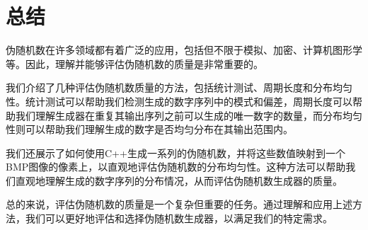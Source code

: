 \documentclass{ctexart}
\begin{document}
\section{总结}

伪随机数在许多领域都有着广泛的应用，包括但不限于模拟、加密、计算机图形学等。因此，理解并能够评估伪随机数的质量是非常重要的。

我们介绍了几种评估伪随机数质量的方法，包括统计测试、周期长度和分布均匀性。统计测试可以帮助我们检测生成的数字序列中的模式和偏差，周期长度可以帮助我们理解生成器在重复其输出序列之前可以生成的唯一数字的数量，而分布均匀性则可以帮助我们理解生成的数字是否均匀分布在其输出范围内。

我们还展示了如何使用C++生成一系列的伪随机数，并将这些数值映射到一个BMP图像的像素上，以直观地评估伪随机数的分布均匀性。这种方法可以帮助我们直观地理解生成的数字序列的分布情况，从而评估伪随机数生成器的质量。

总的来说，评估伪随机数的质量是一个复杂但重要的任务。通过理解和应用上述方法，我们可以更好地评估和选择伪随机数生成器，以满足我们的特定需求。



\end{document}
